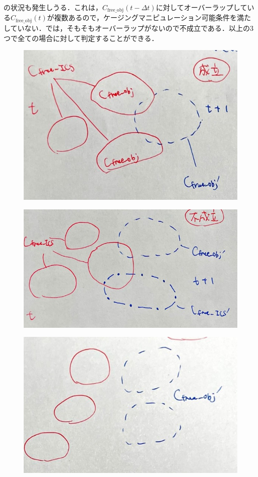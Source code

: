 \documentclass[a4paper,twoside,12pt,papersize, dvipdfmx]{iirthesis}
\begin{document}
{の状況も発生しうる．これは，$C_{\mathrm{free\_obj}}(t-\Delta t)$に対してオーバーラップしている$C_{\mathrm{free\_obj}}(t)$が複数あるので，ケージングマニピュレーション可能条件を満たしていない．では，そもそもオーバーラップがないので不成立である．以上の3つで全ての場合に対して判定することができる．

\begin{figure}[b]
\begin{minipage}{0.33\hsize}
\includegraphics[width=0.95\hsize]{fig/3-new-planner/rev_cagingmani_var1.jpg}
\subcaption{}\label{fig::planner::cm1}
\end{minipage}\hfill
\begin{minipage}{0.33\hsize}
\includegraphics[width=0.95\hsize]{fig/3-new-planner/rev_cagingmani_var2.jpg}
\subcaption{}\label{fig::planner::cm2}
\end{minipage}\hfill
\begin{minipage}{0.33\hsize}
\includegraphics[width=0.95\hsize]{fig/3-new-planner/rev_cagingmani_var3.jpg}

\end{minipage}
\end{figure}}
\end{document}
